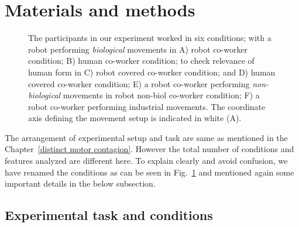 \clearpage

\section{Materials and methods} \label{methods}

\begin{figure}[b]
	\caption{The participants in our experiment worked in six conditions; with a robot performing \textit{biological} movements in A) robot co-worker condition; B) human co-worker condition; to check relevance of  human form in C) robot covered co-worker condition; and D) human covered co-worker condition; E) a robot co-worker performing \textit{non-biological} movements in robot non-biol co-worker condition; F) a robot co-worker performing industrial movements. The coordinate axis defining the movement setup is indicated in white (A).}
	\label{fig:setup1}
\end{figure}

The arrangement of experimental setup and task are same as mentioned in the Chapter~\ref{distinct motor contagion}. However the total number of conditions and features analyzed are different here. To explain clearly and avoid confusion, we have renamed the conditions as can be seen in Fig.~\ref{fig:setup1} and mentioned again some important details in the below subsection.

\subsection{Experimental task and conditions}

